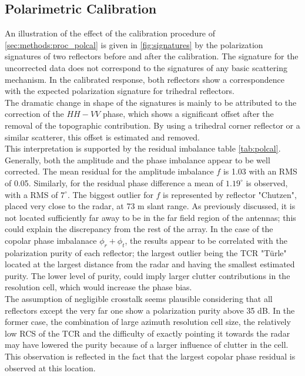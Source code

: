 \subsection{Polarimetric Calibration}
An illustration of the effect of the calibration procedure of \autoref{sec:methods:proc_polcal} is given in  \autoref{fig:signatures} by the polarization signatures of two reflectors before and after the calibration.
The signature for the uncorrected data does not correspond to the signatures of any basic scattering mechanism. In the calibrated response, both reflectors show a correspondence with the expected polarization signature for trihedral reflectors.\\ The dramatic change in shape of the signatures is mainly to be attributed to the correction of the $HH-VV$ phase, which shows a significant offset after the removal of the topographic contribution. By using a trihedral corner reflector or a similar scatterer, this offset is estimated and removed.\\
This interpretation is supported by the residual imbalance table \autoref{tab:polcal}.
Generally, both the amplitude and the phase imbalance appear to be well corrected. The mean residual for the amplitude imbalance $f$ is 1.03 with an RMS of 0.05. Similarly, for the residual phase difference a mean of $1.19^\circ$ is observed, with a RMS of $7^\circ$. The biggest outlier for $f$ is represented by reflector "Chutzen", placed very close to the radar, at 73 m slant range. As previously discussed, it is not located sufficiently far away to be in the far field region of the antennas; this could explain the discrepancy from the rest of the array. In the case of the copolar phase imbalanace $\phi_r + \phi_t$, the results appear to be correlated with the polarization purity of each reflector; the largest outlier being the TCR "T\"{u}rle" located at the largest distance from the radar and having the smallest estimated purity. The lower level of purity, could imply larger clutter contributions in the resolution cell, which would increase the phase bias.\\
The assumption of negligible crosstalk seems plausible considering that all reflectors  except the very far one show a polarization purity above 35 dB. In the former case, the combination of large azimuth resolution cell size, the relatively low RCS of the TCR and  the difficulty of exactly pointing it towards the radar may have lowered the purity because of a larger influence of clutter in the cell. This observation is reflected in the fact that the largest copolar phase residual is observed at this location.\\
